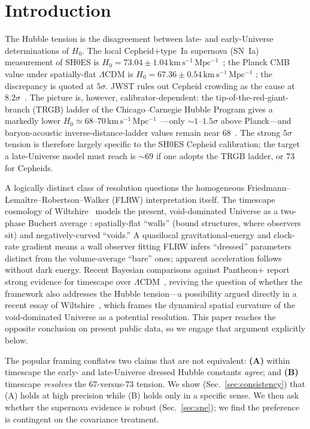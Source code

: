 \documentclass[aps,prd,twocolumn,nofootinbib,superscriptaddress,floatfix]{revtex4-2}
\newcommand{\Ho}{H_{0}}
\newcommand{\kmsmpc}{\,\mathrm{km\,s^{-1}\,Mpc^{-1}}}
\newcommand{\Lcdm}{\Lambda\mathrm{CDM}}
\begin{document}
\section{Introduction}
\label{sec:intro}

The Hubble tension is the disagreement between late- and early-Universe
determinations of $\Ho$. The local Cepheid$+$type~Ia supernova (SN~Ia)
measurement of SH0ES is $\Ho=73.04\pm1.04\kmsmpc$~\cite{Riess2022}; the Planck
CMB value under spatially-flat $\Lcdm$ is $\Ho=67.36\pm0.54\kmsmpc$
\cite{Planck2018}; the discrepancy is quoted at $5\sigma$. JWST rules out
Cepheid crowding as the cause at $8.2\sigma$~\cite{Riess2024JWST}. The picture is,
however, calibrator-dependent: the tip-of-the-red-giant-branch (TRGB) ladder of
the Chicago--Carnegie Hubble Program gives a markedly lower
$\Ho\simeq68$--$70\kmsmpc$~\cite{Freedman2024,CCHP2025}---only $\sim\!1$--$1.5
\sigma$ above Planck---and baryon-acoustic inverse-distance-ladder values remain
near $68$~\cite{DESI2024}. The strong $5\sigma$ tension is therefore largely
specific to the SH0ES Cepheid calibration; the target a late-Universe model must
reach is $\sim\!69$ if one adopts the TRGB ladder, or $73$ for Cepheids.

A logically distinct class of resolution questions the homogeneous
Friedmann--Lema\^itre--Robertson--Walker (FLRW) interpretation itself. The
timescape cosmology of Wiltshire~\cite{Wiltshire2007,Wiltshire2009} models the
present, void-dominated Universe as a two-phase Buchert average
\cite{Buchert2000}: spatially-flat ``walls'' (bound structures, where observers
sit) and negatively-curved ``voids.'' A quasilocal gravitational-energy and
clock-rate gradient means a wall observer fitting FLRW infers ``dressed''
parameters distinct from the volume-average ``bare'' ones; apparent acceleration
follows without dark energy. Recent Bayesian comparisons against Pantheon$+$
report strong evidence for timescape over $\Lcdm$~\cite{Seifert2024,Lane2025},
reviving the question of whether the framework also addresses the Hubble tension---a
possibility argued directly in a recent essay of Wiltshire~\cite{Wiltshire2024GRF},
which frames the dynamical spatial curvature of the void-dominated Universe as a
potential resolution. This paper reaches the opposite conclusion on present public data,
so we engage that argument explicitly below.

The popular framing conflates two claims that are not equivalent: \textbf{(A)}
within timescape the early- and late-Universe dressed Hubble constants
\emph{agree}; and \textbf{(B)} timescape \emph{resolves} the $67$-versus-$73$
tension. We show (Sec.~\ref{sec:consistency}) that (A) holds at high precision
while (B) holds only in a specific sense. We then ask whether the supernova
evidence is robust (Sec.~\ref{sec:sne}); we find the preference is contingent on
the covariance treatment.
\end{document}
